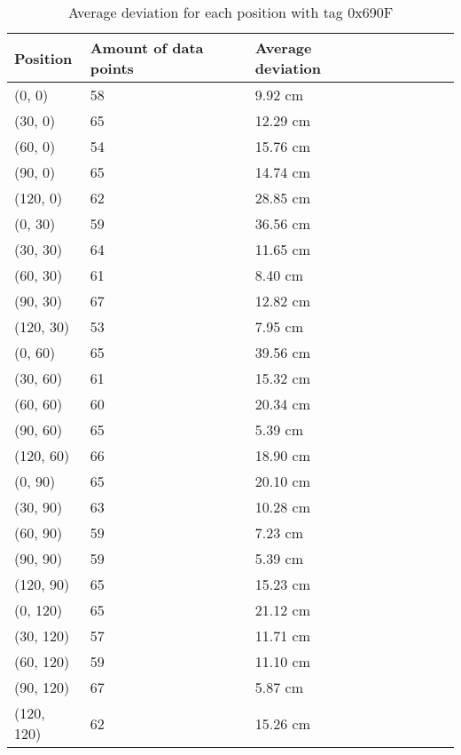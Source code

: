 \begin{table}[H]
    \centering
    \begin{tabular}{|l|l|l|l|l|l|l|l|}
        \hline
        Position   & Amount of data points & Average deviation \\ \hline
        (0, 0)     & 58                    & 9.92 cm           \\ \hline
        (30, 0)    & 65                    & 12.29 cm          \\ \hline
        (60, 0)    & 54                    & 15.76 cm          \\ \hline
        (90, 0)    & 65                    & 14.74 cm          \\ \hline
        (120, 0)   & 62                    & 28.85 cm          \\ \hline
        (0, 30)    & 59                    & 36.56 cm          \\ \hline
        (30, 30)   & 64                    & 11.65 cm          \\ \hline
        (60, 30)   & 61                    & 8.40 cm           \\ \hline
        (90, 30)   & 67                    & 12.82 cm          \\ \hline
        (120, 30)  & 53                    & 7.95 cm           \\ \hline
        (0, 60)    & 65                    & 39.56 cm          \\ \hline
        (30, 60)   & 61                    & 15.32 cm          \\ \hline
        (60, 60)   & 60                    & 20.34 cm          \\ \hline
        (90, 60)   & 65                    & 5.39 cm           \\ \hline
        (120, 60)  & 66                    & 18.90 cm          \\ \hline
        (0, 90)    & 65                    & 20.10 cm          \\ \hline
        (30, 90)   & 63                    & 10.28 cm          \\ \hline
        (60, 90)   & 59                    & 7.23 cm           \\ \hline
        (90, 90)   & 59                    & 5.39 cm           \\ \hline
        (120, 90)  & 65                    & 15.23 cm          \\ \hline
        (0, 120)   & 65                    & 21.12 cm          \\ \hline
        (30, 120)  & 57                    & 11.71 cm          \\ \hline
        (60, 120)  & 59                    & 11.10 cm          \\ \hline
        (90, 120)  & 67                    & 5.87 cm           \\ \hline
        (120, 120) & 62                    & 15.26 cm          \\ \hline
    \end{tabular}
    \label{average-deviation-1-tag}
    \caption{Average deviation for each position with tag 0x690F}
\end{table}

